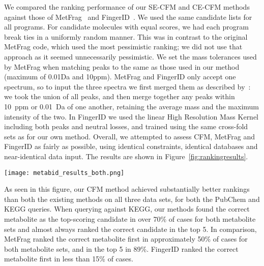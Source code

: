 We compared the ranking performance of our SE-CFM and CE-CFM methods against those of MetFrag~\citep{Wolf2010} and FingerID~\citep{Heinonen2012}. 
We used the same candidate lists for all programs. 
For candidate molecules with equal scores, we had each program break ties in a uniformly random manner. This was in contrast to the original MetFrag code, which used the most pessimistic ranking; we did not use that approach as it seemed unnecessarily pessimistic. 
We set the mass tolerances used by MetFrag when matching peaks to the same as those used in our method (maximum of 0.01Da and 10ppm). 
MetFrag and FingerID only accept one spectrum, so to input the three spectra we first merged them as described by~\citep{Wolf2010}: 
we took the union of all peaks, and then merge together any peaks within 10~ppm or 0.01~Da of one another, retaining the average mass and the maximum intensity of the two. 
In FingerID we used the linear High Resolution Mass Kernel including both peaks and neutral losses, and trained using the same cross-fold sets as for our own method.
Overall, we attempted to assess CFM, MetFrag and FingerID as fairly as possible, using identical constraints, identical databases and near-identical data input. 
The results are shown in Figure~\ref{fig:rankingresults}. 

\begin{figure*}
\begin{center}
\texttt{[image: metabid\_results\_both.png]}
\caption{Ranking results for metabolite identification, comparing both CFM variants with MetFrag and FingerID for tripeptides (left), metabolites from Metlin (middle) and validation metabolites from MassBank (right), querying against PubChem within 5~ppm (circles) and KEGG within 0.5~Da (triangles). Note that our methods out-perform both MetFrag and FingerID on all metrics, regardless of the database used.}
\label{fig:rankingresults}
\end{center}
\vspace{-1.25em}
\end{figure*}

As seen in this figure, our CFM method achieved substantially better rankings than both the existing methods on all three data sets, for both the PubChem and KEGG queries. When querying against KEGG, our methods found the correct metabolite as the top-scoring candidate in over 70\% of cases for both metabolite sets and almost always  ranked the correct candidate in the top 5. In comparison, MetFrag ranked the correct metabolite first in approximately 50\% of cases for both metabolite sets, and in the top 5 in 89\%. FingerID ranked the correct metabolite first in less than 15\% of cases.


